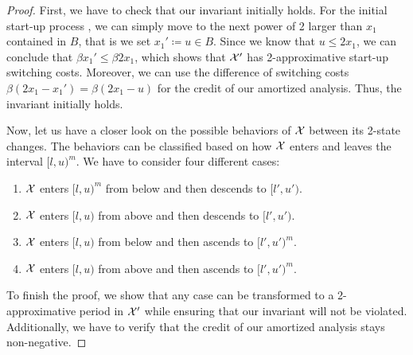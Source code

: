 \begin{proof}
First, we have to check that our invariant initially holds. For the initial start-up process , we can simply move to the next power of 2 larger than $x_1$ contained in $B$, that is we set $x_1'\coloneqq u\in B$. Since we know that $u\le2x_1$, we can conclude that $\beta x_1'\le\beta 2x_1$, which shows that $\mathcal{X}'$ has 2-approximative start-up switching costs. Moreover, we can use the difference of switching costs $\beta(2x_1-x_1')=\beta(2x_1-u)$ for the credit of our amortized analysis. Thus, the invariant initially holds. 

Now, let us have a closer look on the possible behaviors of $\mathcal{X}$ between its 2-state changes. The behaviors can be classified based on how $\mathcal{X}$ enters and leaves the interval $[l,u)^m$. We have to consider four different cases:
\begin{enumerate}[label=(\alph*)]
	\item $\mathcal{X}$ enters $[l,u)^m$ from below and then descends to $[l',u')$.\label{itm:schedule_behavior_up_down}
	\item $\mathcal{X}$ enters $[l,u)$ from above and then descends to $[l',u')$.\label{itm:schedule_behavior_down_down}
	\item $\mathcal{X}$ enters $[l,u)$ from below and then ascends to $[l',u')^m$.\label{itm:schedule_behavior_up_up} 
	\item $\mathcal{X}$ enters $[l,u)$ from above and then ascends to $[l',u')^m$.\label{itm:schedule_behavior_down_up} 
\end{enumerate}
To finish the proof, we show that any case can be transformed to a 2-approximative period in $\mathcal{X}'$ while ensuring that our invariant will not be violated. Additionally, we have to verify that the credit of our amortized analysis stays non-negative.
	

\end{proof}
